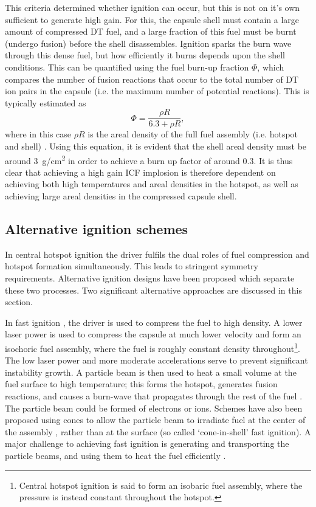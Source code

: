 This criteria determined whether ignition can occur, but this is not on it's own sufficient to generate high gain. For this, the capsule shell must contain a large amount of compressed DT fuel, and a large fraction of this fuel must be burnt (undergo fusion) before the shell disassembles. Ignition sparks the burn wave through this dense fuel, but how efficiently it burns depends upon the shell conditions. This can be quantified using the fuel burn-up fraction $\Phi$, which compares the number of fusion reactions that occur to the total number of DT ion pairs in the capsule (i.e. the maximum number of potential reactions). This is typically estimated as 
\begin{equation} \Phi = \frac{ \rho R} {6.3 + \rho R}, \end{equation}
where in this case $\rho R$ is the areal density of the full fuel assembly (i.e. hotspot and shell) \cite{Fraley1974}. Using this equation, it is evident that the shell areal density must be around 3~\si[per-mode=symbol]{\gram\per\centi\meter\squared} in order to achieve a burn up factor of around 0.3. It is thus clear that achieving a high gain ICF implosion is therefore dependent on achieving both high temperatures and areal densities in the hotspot, as well as achieving large areal densities in the compressed capsule shell.

\subsection{Alternative ignition schemes}
In central hotspot ignition the driver fulfils the dual roles of fuel compression and hotspot formation simultaneously. This leads to stringent symmetry requirements. Alternative ignition designs have been proposed which separate these two processes. Two significant alternative approaches are discussed in this section.

In fast ignition \cite{Tabak1994}, the driver is used to compress the fuel to high density. A lower laser power is used to compress the capsule at much lower velocity and form an isochoric fuel assembly, where the fuel is roughly constant density throughout\footnote{Central hotspot ignition is said to form an isobaric fuel assembly, where the pressure is instead constant throughout the hotspot.}. The low laser power and more moderate accelerations serve to prevent significant instability growth. A particle beam is then used to heat a small volume at the fuel surface to high temperature; this forms the hotspot, generates fusion reactions, and causes a burn-wave that propagates through the rest of the fuel \cite{Tabak2005, Tabak2006}. The particle beam could be formed of electrons or ions. Schemes have also been proposed using cones to allow the particle beam to irradiate fuel at the center of the assembly \cite{Kodama2002, Kitagawa2002}, rather than at the surface (so called `cone-in-shell' fast ignition). A major challenge to achieving fast ignition is generating and transporting the particle beams, and using them to heat the fuel efficiently \cite{Norreys2014}.

